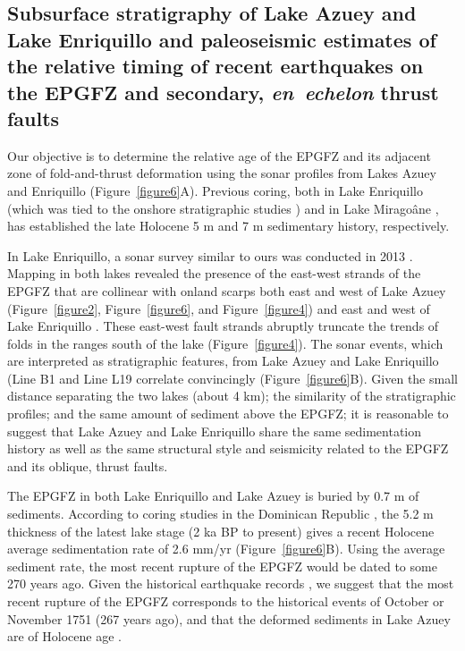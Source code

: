 \documentclass[linenumbers,draft]{agujournal}
\begin{document}
\subsection{Subsurface stratigraphy of Lake Azuey and Lake Enriquillo and paleoseismic estimates of the relative timing of recent earthquakes on the EPGFZ and secondary, \textit{en~echelon} thrust faults}
Our objective is to determine the relative age of the EPGFZ and its adjacent zone of fold-and-thrust deformation using the sonar profiles from Lakes Azuey and Enriquillo (Figure~\ref{figure6}A). Previous coring, both in Lake Enriquillo \citep{rios2013holocene} (which was tied to the onshore stratigraphic studies \citep{taylor1985stratigraphy,rios2013holocene}) and in Lake Mirago\^ane \citep{higuera199910}, has established the late Holocene 5 m and 7 m sedimentary history, respectively.

In Lake Enriquillo, a sonar survey similar to ours was conducted in 2013 \citep{rios2013holocene}. Mapping in both lakes revealed the presence of the east-west strands of the EPGFZ that are collinear with onland scarps both east and west of Lake Azuey (Figure~\ref{figure2}, Figure~\ref{figure6}, and Figure~\ref{figure4}) and east and west of Lake Enriquillo \citep{mann1995actively,rios2013holocene}. These east-west fault strands abruptly truncate the trends of folds in the ranges south of the lake (Figure~\ref{figure4}). The sonar events, which are interpreted as stratigraphic features, from Lake Azuey and Lake Enriquillo (Line B1 and Line L19 correlate convincingly (Figure~\ref{figure6}B). Given the small distance separating the two lakes (about 4 km); the similarity of the stratigraphic profiles; and the same amount of sediment above the EPGFZ; it is reasonable to suggest that Lake Azuey and Lake Enriquillo share the same sedimentation history as well as the same structural style and seismicity related to the EPGFZ and its oblique, thrust faults.

The EPGFZ in both Lake Enriquillo and Lake Azuey is buried by 0.7 m of sediments. According to coring studies in the Dominican Republic \citep{taylor1985stratigraphy,rios2013holocene}, the 5.2 m thickness of the latest lake stage (2 ka BP to present) gives a recent Holocene average sedimentation rate of 2.6 mm/yr (Figure~\ref{figure6}B). Using the average sediment rate, the most recent rupture of the EPGFZ would be dated to some 270 years ago. Given the historical earthquake records \citep{bakun2012significant}, we suggest that the most recent rupture of the EPGFZ corresponds to the historical events of October or November 1751 (267 years ago), and that the deformed sediments in Lake Azuey are of Holocene age \citep{rios2013holocene}.
\end{document}
